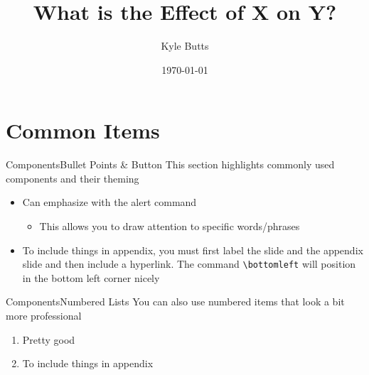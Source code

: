 \documentclass[aspectratio=169,t,11pt,table]{beamer}
\title{What is the Effect of X on Y?}
\date{\today}
\author{Kyle Butts}
\begin{document}
\begin{frame}
\maketitle

\end{frame}

\section{Common Items}

\begin{frame}{Components}{Bullet Points \& Button}\label{main1}
  This section highlights commonly used components and their theming

  \begin{itemize}
    \item Can emphasize with \alert{the alert command}
    
    \begin{itemize}
      \item This allows you to draw attention to specific words/phrases
    \end{itemize}
    
    \item To include things in appendix, you must first label the slide and the appendix slide and then include a hyperlink. The command \texttt{\textbackslash bottomleft} will position in the bottom left corner nicely
  \end{itemize}

\end{frame}


\begin{frame}{Components}{Numbered Lists}
  You can also use numbered items that look a bit more professional

  \begin{enumerate}
    \item Pretty good
    
    \item To include things in appendix
  \end{enumerate}
\end{frame}
\end{document}
